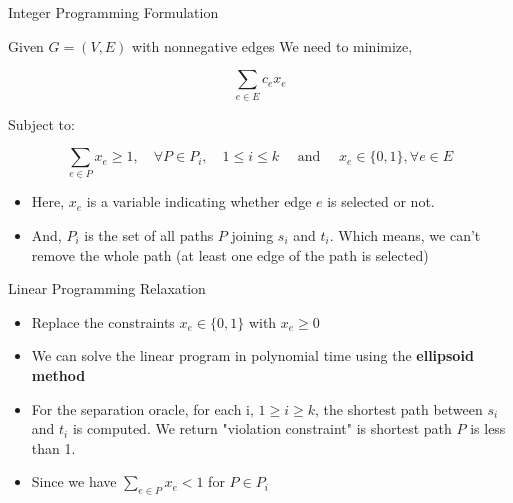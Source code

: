 \documentclass{beamer}
\begin{document}
 



\begin{frame}{Integer Programming Formulation}

Given \(G = (V, E)\) with nonnegative edges  We need to minimize, 

\[
\sum_{e \in E} c_e x_e
\]

Subject to:

\[
\sum_{e \in P} x_e \geq 1, \quad \forall P \in P_i, \quad 1 \leq i \leq k \quad \text{ and } \quad x_e \in \{0, 1\},  \forall e \in E
\] \newline

\begin{itemize}
    \item Here, \(x_e\) is a variable indicating whether edge \(e\) is selected or not.

    \item And, $P_i$ is the set of all paths $P$ joining $s_i$ and $t_i$. Which means, we can't remove the whole path (at least one edge of the path is selected) 

    \end{itemize}
\end{frame}


\begin{frame}{Linear Programming Relaxation}
    \begin{itemize}
        \item Replace the constraints $ x_e \in \{0, 1\} $ with $ x_e \geq 0 $ \newline

        \item We can solve the linear program in polynomial time using the \textbf{ellipsoid method} \newline

        \item For the separation oracle, for each i, $ 1 \geq i \geq k $, the shortest path between $ s_i$ and $t_i$ is computed. We return "violation constraint" is shortest path $ P $ is less than 1. 

        \item Since we have $ \sum_{e \in P} x_e < 1 $ for $ P \in P_i$ 
    \end{itemize}
    
\end{frame}
\end{document}
